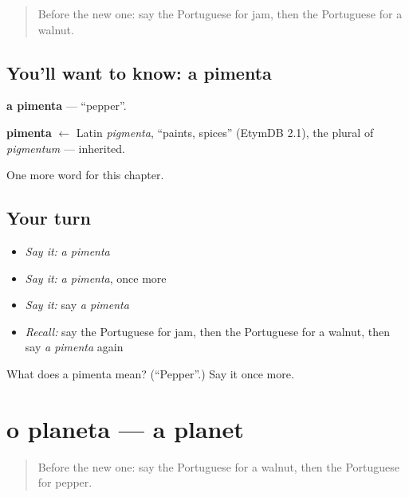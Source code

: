 \label{lesson:PT-C109-pimenta}



\begin{quote}
Before the new one: say the Portuguese for jam, then the Portuguese for a walnut.
\end{quote}

\subsection*{You'll want to know: a pimenta}
\textbf{a pimenta} — \textquotedblleft{}pepper\textquotedblright{}.

\begin{cousinweb}
\textbf{pimenta} $\leftarrow$ Latin \emph{pigmenta}, \textquotedblleft{}paints, spices\textquotedblright{} (EtymDB 2.1), the plural of \emph{pigmentum} — inherited.
\end{cousinweb}

\begin{grammarlens}[title={What you've built}]
One more word for this chapter.
\end{grammarlens}

\subsection*{Your turn}
\begin{itemize}
\raggedright
  \item \emph{Say it:} \emph{a pimenta}
  \item \emph{Say it:} \emph{a pimenta}, once more
  \item \emph{Say it:} say \emph{a pimenta}
  \item \emph{Recall:} say the Portuguese for jam, then the Portuguese for a walnut, then say \emph{a pimenta} again
\end{itemize}

\begin{tcolorbox}[breakable,colback=teal!4,colframe=teal!35!black,title={Before you move on}]
What does a pimenta mean? (\textquotedblleft{}Pepper\textquotedblright{}.) Say it once more.
\end{tcolorbox}
\section[o planeta]{o planeta — a planet}

\label{lesson:PT-C109-planeta}



\begin{quote}
Before the new one: say the Portuguese for a walnut, then the Portuguese for pepper.
\end{quote}

